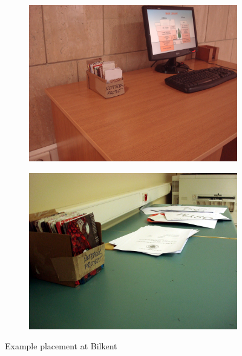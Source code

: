 \begin{figure}
    \centering
    \begin{subfigure}[b]{0.47\textwidth}
        \includegraphics[width=\textwidth]{project_graphics/bilkent1.jpg}
    \end{subfigure}
    \begin{subfigure}[b]{0.47\textwidth}
        \includegraphics[width=\textwidth]{project_graphics/bilkent2.jpg}
    \end{subfigure}
    \caption{Example placement at Bilkent}
    \label{fig:ExperimentWithPaper}
\end{figure}




